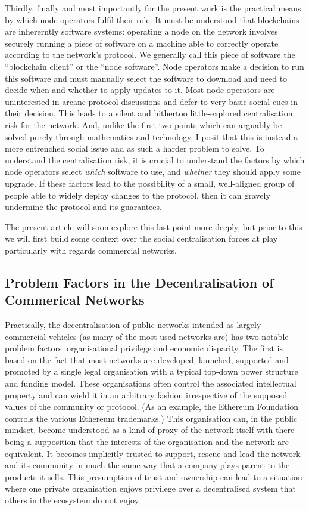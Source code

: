 \documentclass[9pt,oneside]{amsart}
\begin{document}
Thirdly, finally and most importantly for the present work is the practical means by which node operators fulfil their role. It must be understood that blockchains are inhererntly software systems: operating a node on the network involves securely running a piece of software on a machine able to correctly operate according to the network's protocol. We generally call this piece of software the ``blockchain client'' or the ``node software''. Node operators make a decision to run this software and must manually select the software to download and need to decide when and whether to apply updates to it. Most node operators are uninterested in arcane protocol discussions and defer to very basic social cues in their decision. This leads to a silent and hithertoo little-explored centralisation risk for the network. And, unlike the first two points which can arguably be solved purely through mathematics and technology, I posit that this is instead a more entrenched social issue and as such a harder problem to solve. To understand the centralisation risk, it is crucial to understand the factors by which node operators select \emph{which} software to use, and \emph{whether} they should apply some upgrade. If these factors lead to the possibility of a small, well-aligned group of people able to widely deploy changes to the protocol, then it can gravely undermine the protocol and its guarantees.

The present article will soon explore this last point more deeply, but prior to this we will first build some context over the social centralisation forces at play particularly with regards commercial networks.

\subsection{Problem Factors in the Decentralisation of Commerical Networks}

Practically, the decentralisation of public networks intended as largely commercial vehicles (as many of the most-used networks are) has two notable problem factors: organisational privilege and economic disparity. The first is based on the fact that most networks are developed, launched, supported and promoted by a single legal organisation with a typical top-down power structure and funding model. These organisations often control the associated intellectual property and can wield it in an arbitrary fashion irrespective of the supposed values of the community or protocol. (As an example, the Ethereum Foundation controls the various Ethereum trademarks.) This organisation can, in the public mindset, become understood as a kind of proxy of the network itself with there being a supposition that the interests of the organisation and the network are equivalent. It becomes implicitly trusted to support, rescue and lead the network and its community in much the same way that a company plays parent to the products it sells. This presumption of trust and ownership can lead to a situation where one private organisation enjoys privilege over a decentralised system that others in the ecosystem do not enjoy.
\end{document}
